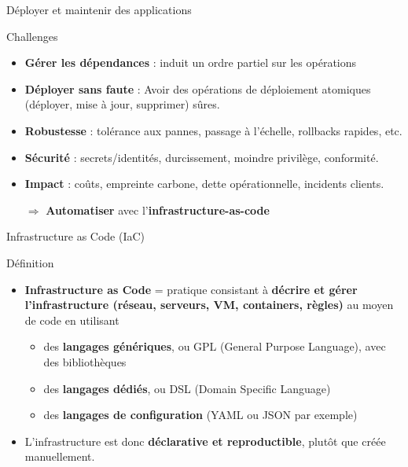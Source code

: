 \documentclass[aspectratio=169,10pt]{beamer}
\begin{document}
\begin{frame}{Déployer et maintenir des applications}

\begin{alertblock}{Challenges}
  \begin{itemize}
    \item \textbf{Gérer les dépendances} : induit un ordre partiel sur les opérations
    \item \textbf{Déployer sans faute} : Avoir des opérations de déploiement atomiques (déployer, mise à jour, supprimer) sûres.
    \item \textbf{Robustesse} : tolérance aux pannes, passage à l'échelle, rollbacks rapides, etc.
    \item \textbf{Sécurité} : secrets/identités, durcissement, moindre privilège, conformité.
    \item \textbf{Impact} : coûts, empreinte carbone, dette opérationnelle, incidents clients.
    \item[$\Rightarrow$] \color{red} \textbf{Automatiser} avec l'\textbf{infrastructure-as-code}
  \end{itemize}
\end{alertblock}

\end{frame}
\begin{frame}{Infrastructure as Code (IaC)}

  \begin{alertblock}{Définition}
    \begin{itemize}
      \item \textbf{Infrastructure as Code} = pratique consistant à 
      \textbf{décrire et gérer l’infrastructure (réseau, serveurs, VM, containers, règles)} 
      au moyen de code en utilisant
    \begin{itemize}
      \item des \textbf{langages génériques}, ou GPL (General Purpose Language), avec des bibliothèques
      \item des \textbf{langages dédiés}, ou DSL (Domain Specific Language)
      \item des \textbf{langages de configuration} (YAML ou JSON par exemple)
    \end{itemize}
      \item L’infrastructure est donc \textbf{déclarative et reproductible}, plutôt que créée manuellement.
    \end{itemize}
  \end{alertblock}
\end{frame}
\end{document}
